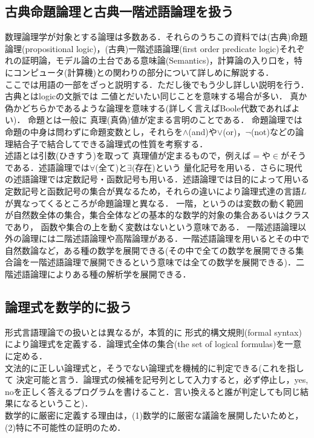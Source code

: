 \documentclass{ltjsarticle}
\theoremstyle{mystyle1}
\theoremstyle{mystyle2}
\newcommand{\red}[1]{{\color{red} #1}}
\begin{document}
\subsection{古典命題論理と古典一階述語論理を扱う}
数理論理学が対象とする論理は多数ある．それらのうちこの資料では(古典)命題論理(propositional logic)，(古典)一階述語論理(first order predicate logic)それぞれの証明論，モデル論の土台である意味論(Semantics)，計算論の入り口を，特にコンピュータ(計算機)との関わりの部分について詳しめに解説する．\\
ここでは用語の一部をざっと説明する．ただし後でもう少し詳しい説明を行う．\\
\red{古典}とはlogicの文脈では\red{二値}とだいたい同じことを意味する場合が多い． 真か偽かどちらかであるような論理を意味する(詳しく言えばBoole代数であればよい)．\red{命題}とは一般に\red{真理(真偽)値}が定まる言明のことである． 命題論理では命題の中身は問わずに命題変数とし，それらを$\wedge$(and)や$\vee$(or)，$\neg$(not)などの論理結合子で結合してできる論理式の性質を考察する．\\
\red{述語}とは引数(ひきすう)を取って 真理値が定まるもので，例えば$=$や$\in$がそうである．述語論理では$\forall$(全て)と$\exists$(存在)という\red{量化記号}を用いる．さらに現代の述語論理では定数記号・函数記号も用いる．述語論理では目的によって用いる定数記号と函数記号の集合が異なるため，それらの違いにより論理式達の言語$L$が異なってくるところが命題論理と異なる．\red{一階}，というのは変数の動く範囲が自然数全体の集合，集合全体などの基本的な数学的対象の集合あるいはクラスであり， 函数や集合の上を動く変数はないという意味である． 一階述語論理以外の論理には二階述語論理や高階論理がある．一階述語論理を用いるとその中で自然数論など，ある種の数学を展開できる(その中で全ての数学を展開できる集合論を一階述語論理で展開できるという意味では全ての数学を展開できる)．二階述語論理によりある種の解析学を展開できる．
\subsection{論理式を数学的に扱う}
形式言語理論での扱いとは異なるが，本質的に\red{形式的構文規則}(formal syntax)により論理式を定義する．論理式全体の集合(the set of logical formulas)を一意に定める．\\
文法的に正しい論理式と，そうでない論理式を機械的に判定できる(これを指して\red{決定可能}と言う．論理式の候補を記号列として入力すると，必ず停止し，yes, noを正しく答えるプログラムを書けること．言い換えると誰が判定しても同じ結果になるということ)．\\
数学的に厳密に定義する理由は，(1)数学的に厳密な議論を展開したいためと，(2)特に不可能性の証明のため．
\end{document}
